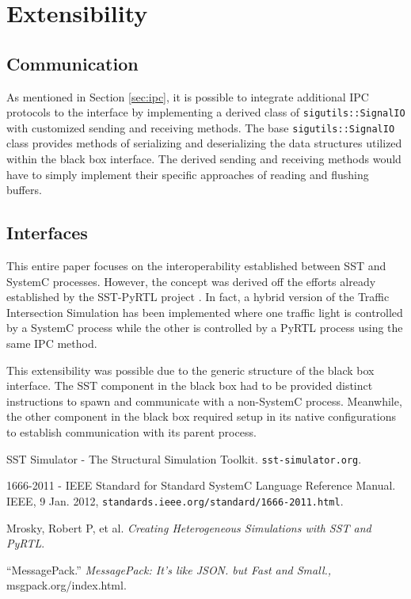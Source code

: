 \documentclass{article}
\begin{document}
  \section{Extensibility}

    \subsection{Communication}
    As mentioned in Section \ref{sec:ipc}, it is possible to integrate additional IPC protocols to
    the interface by implementing a derived class of \lstinline{sigutils::SignalIO} with customized
    sending and receiving methods. The base \lstinline{sigutils::SignalIO} class provides methods of
    serializing and deserializing the data structures utilized within the black box interface. The
    derived sending and receiving methods would have to simply implement their specific approaches
    of reading and flushing buffers.

    \subsection{Interfaces}
    This entire paper focuses on the interoperability established between SST and SystemC processes.
    However, the concept was derived off the efforts already established by the SST-PyRTL project
    \cite{pyrtl-sst}. In fact, a hybrid version of the Traffic Intersection Simulation has been
    implemented where one traffic light is controlled by a SystemC process while the other is
    controlled by a PyRTL process using the same IPC method.

    This extensibility was possible due to the generic structure of the black box interface. The SST
    component in the black box had to be provided distinct instructions to spawn and communicate
    with a non-SystemC process. Meanwhile, the other component in the black box required setup in
    its native configurations to establish communication with its parent process.

  \begin{thebibliography}{5}

     SST Simulator - The Structural Simulation Toolkit. \texttt{sst-simulator.org}.

     1666-2011 - IEEE Standard for Standard SystemC Language Reference Manual. IEEE, 9
    Jan. 2012, \texttt{standards.ieee.org/standard/1666-2011.html}.

     Mrosky, Robert P, et al.
    \textit{Creating Heterogeneous Simulations with SST and PyRTL}.

     ``MessagePack.'' \textit{MessagePack: It's like JSON. but Fast and Small.,}
    msgpack.org/index.html.

  \end{thebibliography}
\end{document}
